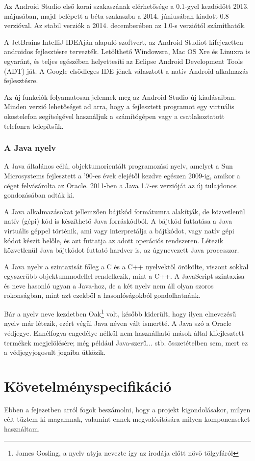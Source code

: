 \documentclass[]{thesis-ekf}
\theoremstyle{definition}
\begin{document}
Az Android Studio első korai szakaszának elérhetősége a 0.1-gyel kezdődött 2013. májusában, majd belépett a béta szakaszba a 2014. júniusában kiadott 0.8 verzióval. Az stabil verziók a 2014. decemberében az 1.0-s verziótól számíthatók.

A JetBrains IntelliJ IDEAján alapuló szoftvert, az Android Studiot kifejezetten androidos fejlesztésre tervezték. Letölthető Windowsra, Mac OS Xre és Linuxra is egyaránt, és teljes egészében helyettesíti az Eclipse Android Development Tools (ADT)-ját. A Google elsődleges IDE-jének választott a natív Android alkalmazás fejlesztésre.

Az új funkciók folyamatosan jelennek meg az Android Studio új kiadásaiban. Minden verzió lehetőséget ad arra, hogy a fejlesztett programot egy virtuális okostelefon segítségével használjuk a számítógépen vagy a csatlakoztatott telefonra telepítsük.
\subsection{A Java nyelv}
A Java általános célú, objektumorientált programozási nyelv, amelyet a Sun Microsystems fejlesztett a ’90-es évek elejétől kezdve egészen 2009-ig, amikor a céget felvásárolta az Oracle. 2011-ben a Java 1.7-es verzióját az új tulajdonos gondozásában adták ki.

A Java alkalmazásokat jellemzően bájtkód formátumra alakítják, de közvetlenül natív (gépi) kód is készíthető Java forráskódból. A bájtkód futtatása a Java virtuális géppel történik, ami vagy interpretálja a bájtkódot, vagy natív gépi kódot készít belőle, és azt futtatja az adott operációs rendszeren. Létezik közvetlenül Java bájtkódot futtató hardver is, az úgynevezett Java processzor.

A Java nyelv a szintaxisát főleg a C és a C++ nyelvektől örökölte, viszont sokkal egyszerűbb objektummodellel rendelkezik, mint a C++. A JavaScript szintaxisa és neve hasonló ugyan a Java-hoz, de a két nyelv nem áll olyan szoros rokonságban, mint azt ezekből a hasonlóságokból gondolhatnánk.

Bár a nyelv neve kezdetben Oak\footnote{James Gosling, a nyelv atyja nevezte így az irodája előtt növő tölgyfáról} volt, később kiderült, hogy ilyen elnevezésű nyelv már létezik, ezért végül Java néven vált ismertté. A Java szó a Oracle védjegye. Ennélfogva engedélye nélkül nem használható mások által kifejlesztett termékek megjelölésére; még például Java-szerű... stb. összetételben sem, mert ez a védjegyjogosult jogaiba ütközik.
\chapter{Követelményspecifikáció}\label{kövspec}
Ebben a fejezetben arról fogok beszámolni, hogy a projekt kigondolásakor, milyen célt tűztem ki magamnak, valamint ennek megvalósítására milyen komponenseket használtam.
\end{document}
